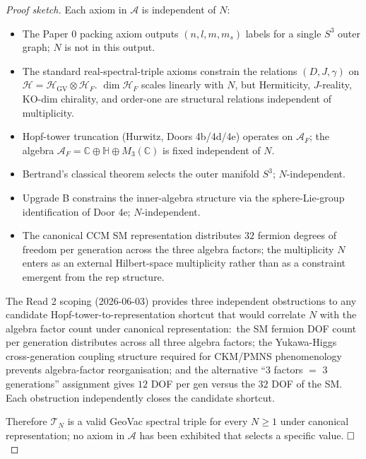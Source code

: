 \documentclass[11pt]{article}
\begin{document}
\begin{proof}[Proof sketch]
Each axiom in $\mathcal{A}$ is independent of $N$:
\begin{itemize}\setlength{\itemsep}{2pt}
\item The Paper 0 packing axiom outputs $(n, l, m, m_s)$ labels for a
  single $S^3$ outer graph;  $N$ is not in this output.
\item The standard real-spectral-triple axioms constrain the relations
  $(D, J, \gamma)$ on $\mathcal{H} = \mathcal{H}_{\mathrm{GV}} \otimes
  \mathcal{H}_F$.  $\dim \mathcal{H}_F$ scales linearly with $N$, but
  Hermiticity, $J$-reality, KO-dim chirality, and order-one are
  structural relations independent of multiplicity.
\item Hopf-tower truncation (Hurwitz, Doors 4b/4d/4e) operates on
  $\mathcal{A}_F$;  the algebra $\mathcal{A}_F = \mathbb{C} \oplus
  \mathbb{H} \oplus M_3(\mathbb{C})$ is fixed independent of $N$.
\item Bertrand's classical theorem selects the outer manifold $S^3$;
  $N$-independent.
\item Upgrade B constrains the inner-algebra structure via the
  sphere-Lie-group identification of Door 4e;  $N$-independent.
\item The canonical CCM SM representation distributes $32$ fermion
  degrees of freedom per generation across the three algebra factors;
  the multiplicity $N$ enters as an external Hilbert-space multiplicity
  rather than as a constraint emergent from the rep structure.
\end{itemize}

The Read 2 scoping
(2026-06-03)
provides three independent obstructions to any candidate
Hopf-tower-to-representation shortcut that would correlate $N$ with
the algebra factor count under canonical representation:\ the SM
fermion DOF count per generation distributes across all three algebra
factors;  the Yukawa-Higgs cross-generation coupling structure
required for CKM/PMNS phenomenology prevents algebra-factor
reorganisation;  and the alternative ``3 factors $=$ 3 generations''
assignment gives $12$ DOF per gen versus the $32$ DOF of the SM.
Each obstruction independently closes the candidate shortcut.

Therefore $\mathcal{T}_N$ is a valid GeoVac spectral triple for every
$N \ge 1$ under canonical representation;  no axiom in $\mathcal{A}$
has been exhibited that selects a specific value. $\hfill\square$
\end{proof}
\end{document}
